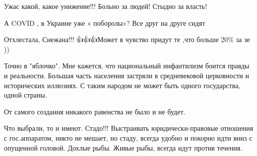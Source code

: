 \begin{itemize}
Ужас какой, какое унижение!!! Больно за людей! Стыдно за власть!

 
А COVID , в Украине уже « поборолы»? Все друг на друге сидят 🤦🏼‍♀️

 
Отхлестала, Снежана!!! 👍👍👍Может в чувство придут те ,что больше 20\% за зе ))

 

Точно в "яблочко". Мне кажется, что национальный инфантилизм боится правды и
реальности. Большая часть населения застряли в средневековой церковности и
исторических иллюзиях. С таким народом не может быть одного государства, одной
страны.


 
От самого создания никакого равенства не было и не будет.

 

Что выбрали, то и имеют. Стадо!!! Выстраивать юридически-правовые отношения с
гос.аппаратом, никто не мешает, но стаду, всегда удобно и покорно идти вниз с
опущенной головой. Дохлые рыбы. Живые рыбы, всегда идут против течения.


 


\end{itemize}
